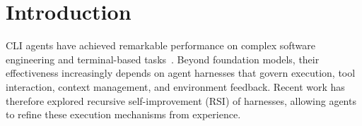 \documentclass{article} %
\begin{document}

    
    

\section{Introduction}

CLI agents have achieved remarkable performance on complex software engineering and terminal-based tasks~\citep{jimenez2024swe,deng2025swe,merrill2026terminalbenchbenchmarkingagentshard,hong-etal-2026-hiras}. Beyond foundation models, their effectiveness increasingly depends on agent harnesses that govern execution, tool interaction, context management, and environment feedback. Recent work has therefore explored recursive self-improvement (RSI) of harnesses, allowing agents to refine these execution mechanisms from experience.
\end{document}
